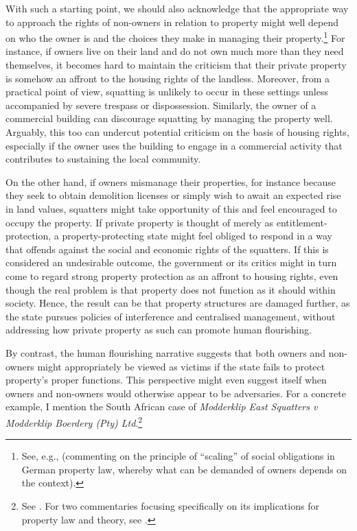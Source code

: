 With such a starting point, we should also acknowledge that the appropriate way to approach the rights of non-owners in relation to property might well depend on who the owner is and the choices they make in managing their property.\footnote{See, e.g., \cite[43]{walt11} (commenting on the principle of ``scaling'' of social obligations in German property law, whereby what can be demanded of owners depends on the context).} For instance, if owners live on their land and do not own much more than they need themselves, it becomes hard to maintain the criticism that their private property is somehow an affront to the housing rights of the landless. Moreover, from a practical point of view, squatting is unlikely to occur in these settings unless accompanied by severe trespass or dispossession. Similarly,  the owner of a commercial building can discourage squatting by managing the property well. Arguably, this too can undercut potential criticism on the basis of housing rights, especially if the owner uses the building to engage in a commercial activity that contributes to sustaining the local community.

On the other hand, if owners mismanage their properties, for instance because they seek to obtain demolition licenses or simply wish to await an expected rise in land values, squatters might take opportunity of this and feel encouraged to occupy the property. If private property is thought of merely as entitlement-protection, a property-protecting state might feel obliged to respond in a way that offends against the social and economic rights of the squatters. If this is considered an undesirable outcome, the government or its critics might in turn come to regard strong property protection as an affront to housing rights, even though the real problem is that property does not function as it should within society. Hence, the result can be that property structures are damaged further, as the state pursues policies of interference and centralised management, without addressing how private property as such can promote human flourishing.

By contrast, the human flourishing narrative suggests that both owners and non-owners might appropriately be viewed as victims if the state fails to protect property's proper functions. This perspective might even suggest itself when owners and non-owners would otherwise appear to be adversaries. For a concrete example, I mention the South African case of {\it Modderklip East Squatters v Modderklip Boerdery (Pty) Ltd}.\footnote{See \cite{modderklip05}. For two commentaries focusing specifically on its implications for property law and theory, see \cite{alexander09d,walt05}.}

